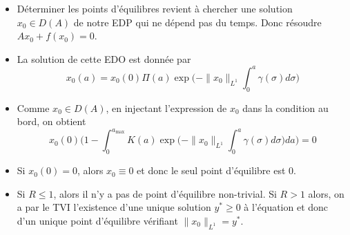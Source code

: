 \begin{frame}
    \begin{itemize}
        \item Déterminer les points d'équilibres revient à chercher une solution $x_0 \in D(A)$ de notre EDP qui ne dépend pas du temps. Donc résoudre $Ax_0+f(x_0) = 0$.\pause
        \item La solution de cette EDO est donnée par 
        \begin{equation*}
            x_0(a) = x_0(0)\Pi(a)\exp\bigg(-\|x_0\|_{L^1}\int_0^a\gamma(\sigma)d \sigma\bigg)
        \end{equation*} \pause
        \item Comme $x_0 \in D(A)$, en injectant l'expression de $x_0$ dans la condition au bord, on obtient
        \begin{equation*}
            x_0(0)\bigg(1-\int_0^{a_{\max}}K(a)\exp\bigg(-\|x_0\|_{L^1}\int_0^a \gamma(\sigma)d \sigma\bigg)d a\bigg) = 0
        \end{equation*}
        \item Si $x_0(0)=0$, alors $x_0\equiv 0$ et donc le seul point d'équilibre est $0$. \pause
        \item Si $R\leq1$, alors il n'y a pas de point d'équilibre non-trivial. Si $R > 1$ alors, on a par le TVI l'existence d'une unique solution $y^*\geq 0$ à l'équation et donc d'un unique point d'équilibre vérifiant
        $\|x_0\|_{L^1}=y^*$.
    \end{itemize}
\end{frame}

